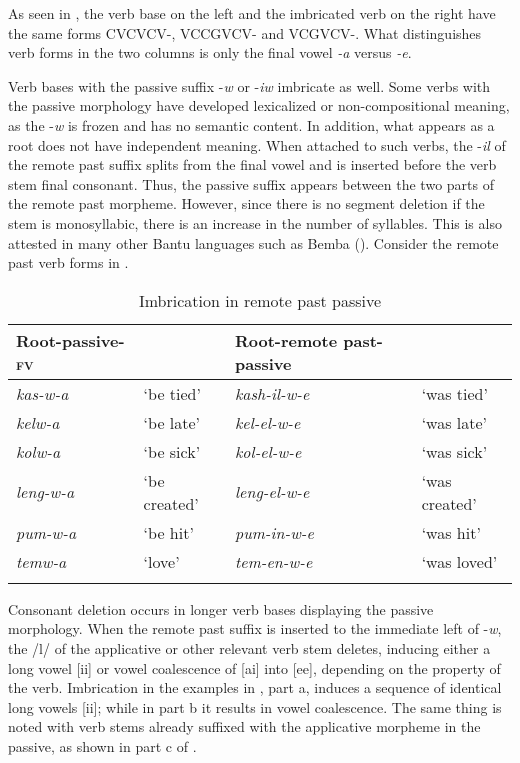 \documentclass[output=paper]{langsci/langscibook}
\begin{document}
As seen in , the verb base on the left and the imbricated verb on the right have the same forms CVCVCV-, VCCGVCV- and VCGVCV-. What distinguishes verb forms in the two columns is only the final vowel \textit{-a} versus \textit{-e}.

 
Verb bases with the passive suffix -\textit{w} or -\textit{iw }imbricate as well. Some verbs with the passive morphology have developed lexicalized or non-compositional meaning, as the -\textit{w} is frozen and has no semantic content. In addition, what appears as a root does not have independent meaning. When attached to such verbs, the -\textit{il} of the remote past suffix splits from the final vowel and is inserted before the verb stem final consonant. Thus, the passive suffix appears between the two parts of the remote past morpheme. However, since there is no segment deletion if the stem is monosyllabic, there is an increase in the number of syllables. This is also attested in many other Bantu languages such as Bemba (\citealt{chebanne1993,hyman1995,kula2002}). Consider the remote past verb forms in .
 

\begin{table}
\begin{tabularx}{\textwidth}{lXlX}
\lsptoprule
Root-passive-\textsc{fv} &  & Root-remote past-passive & \\
\midrule 
\textit{kas-w-a} & `be tied' & \textit{kash-il-w-e} & `was tied' \\
\textit{kelw-a} & `be late' & \textit{kel-el-w-e} & `was late' \\
\textit{kolw-a} & `be sick' & \textit{kol-el-w-e} & `was sick' \\
\textit{leng-w-a} & `be created' & \textit{leng-el-w-e} & `was created' \\
\textit{pum-w-a} & `be hit' & \textit{pum-in-w-e} & `was hit' \\
\textit{temw-a} & `love' & \textit{tem-en-w-e} & `was loved' \\

\lspbottomrule
\end{tabularx}

\caption{Imbrication in remote past passive}
\label{tab:25.kawasha}

\end{table}

Consonant deletion occurs in longer verb bases displaying the passive morphology. When the remote past suffix is inserted to the immediate left of -\textit{w}, the /l/ of the applicative or other relevant verb stem deletes, inducing either a long vowel [ii] or vowel coalescence of [ai] into [ee], depending on the property of the verb. Imbrication in the examples in , part a, induces a sequence of identical long vowels [ii]; while in part b it results in vowel coalescence. The same thing is noted with verb stems already suffixed with the applicative morpheme in the passive, as shown in part c of .
\end{document}
